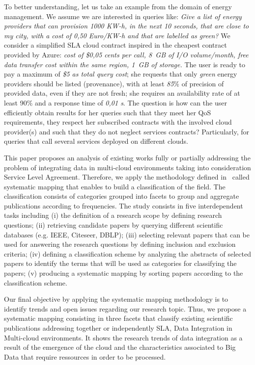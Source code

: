 To better understanding, let us take an example from the domain of energy
management. We assume we are interested in queries like: \textit{Give a list
of energy providers that can provision 1000 KW-h, in the next 10 seconds, that are close to my city, with a cost of 0,50 Euro/KW-h and that are labelled as green?} We consider a simplified SLA cloud contract inspired in the cheapest contract provided by Azure: \textit{cost of \$0,05 cents per call,  8~GB of I/O volume/month, free data transfer cost within the same region,  1~GB of storage.} 
The user is ready to pay a maximum of \textit{\$5 as total query cost}; she requests that only  \textit{green} energy providers should be  listed (provenance), with at least  \textit{85$\%$} of precision of provided data, even if they are not fresh; she requires an availability rate of at least 90$\%$ and a response time of  \textit{0,01 s}. 
  The question is how can the user efficiently obtain  results for her queries such that they meet her QoS requirements, they respect her subscribed contracts with the involved cloud provider(s) and such that they do not neglect services contracts? Particularly, for queries that call several services deployed  on different clouds.

This paper proposes an analysis of existing works fully or partially addressing the problem of integrating data in multi-cloud environments taking into consideration Service Level Agreement. Therefore, we apply the  methodology defined in~\cite{SM:Petersen:2008} called  systematic mapping  that enables to build a classification of the field. The classification consists of categories grouped into facets  to group and aggregate  publications according to frequencies. The study consists in  five interdependent tasks including (i) the definition of a research scope by defining research questions; (ii) retrieving candidate papers by querying different scientific databases (e.g. IEEE, Citeseer, DBLP); (iii) selecting relevant papers that can be used for answering the research questions by defining inclusion and exclusion criteria; (iv) defining a classification scheme by  analyzing the abstracts of selected papers to identify the terms that will be used as categories for classifying the papers; (v) producing a systematic mapping by sorting papers according to the classification scheme. 

Our final objective by applying the systematic mapping methodology is to identify trends and open issues regarding our research topic. Thus, we propose a systematic mapping consisting in three facets that classify existing scientific publications addressing  together or independently SLA, Data Integration in Multi-cloud environments. It shows the research trends of data integration as a result of the emergence of the cloud and the characteristics associated to Big Data that require ressources in order to be processed.


